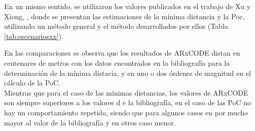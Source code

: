 En un mismo sentido, se utilizaron los valores publicados en el trabajo de Xu y  Xiong, \citep{xu2014method}, donde  se presentan las estimaciones de la m\'inima distancia y la Poc, utilizando un m\'etodo general y el m\'etodo desarrollados por ellos (Tabla \ref{tab:escenariosxx}).\\

 \begin{table}[!h]
\centering
{}
\caption{Comparaci\'on de las m\'inimas distancias de acercamiento y las PoC calculadas con ARxCODE con los resultados publicados por  Xu \& Xiong \citep{xu2014method}. Paso de propagaci\'on cien mil $\mu$s y radio de colisi\'on $r_{a}=0.01$ km. (*) No se obtuvieron TLEs del desecho para la fecha publicada. }
\label{tab:escenariosxx}
\end{table}

En las comparaciones se observa que los resultados de ARxCODE distan en centenares de metros con los datos encontrados en la bibliograf\'ia para la determinaci\'on de la m\'inima distacia, y en uno o dos \'ordenes de magnitud en el c\'alculo de la PoC.\\
Mientras que para el caso de las m\'inimas distancias, los valores de ARxCODE son siempre superiores a los valores d e la bibliograf\'ia, en el caso de las PoC no hay un comportamiento repetido, siendo que para algunos casos en por mucho mayor al valor de la bibliograf\'ia y en otros caso menor.\\ 

